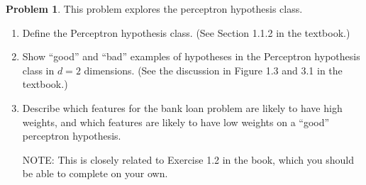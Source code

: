 \documentclass[10pt]{article}
\theoremstyle{definition}
\newtheorem{problem}{Problem}
\begin{document}
\newpage
\begin{problem}
    This problem explores the perceptron hypothesis class.
    \begin{enumerate}
    \item
    Define the Perceptron hypothesis class.
    (See Section 1.1.2 in the textbook.)
            \vspace{4in}

    \item
    Show ``good'' and ``bad'' examples of hypotheses in the Perceptron hypothesis class in $d=2$ dimensions.
    (See the discussion in Figure 1.3 and 3.1 in the textbook.)


            \vspace{4in}

    \item
    Describe which features for the bank loan problem are likely to have high weights, and which features are likely to have low weights on a ``good'' perceptron hypothesis.

    NOTE:
        This is closely related to Exercise 1.2 in the book, which you should be able to complete on your own.

        \newpage
    \end{enumerate}
\end{problem}

\end{document}

